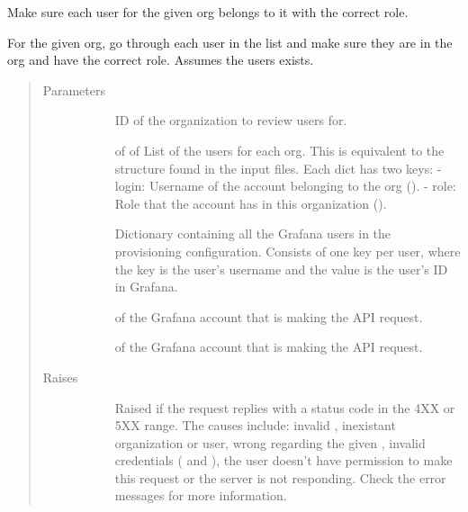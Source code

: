 \documentclass[letterpaper,10pt,english]{sphinxmanual}
\begin{document}
\begin{fulllineitems}
\label{\detokenize{accounts:gpAccounts.reviewOrgUsers}}
Make sure each user for the given org belongs to it with the correct role.

For the given org, go through each user in the list and make sure they are in
the org and have the correct role. Assumes the users exists.
\begin{quote}\begin{description}
\item[{Parameters}] \leavevmode\begin{description}
\item[{}] \leavevmode{[}\sphinxtitleref{int}{]}
ID of the organization to review users for.

\item[{}] \leavevmode{[} of  of \sphinxtitleref{str}{]}
List of the users for each org. This is equivalent to the structure found
in the  input files. Each dict has two keys:
- login: Username of the account belonging to the org ().
- role: Role that the account has in this organization ().

\item[{}] \leavevmode{[}\sphinxtitleref{dict}{]}
Dictionary containing all the Grafana users in the provisioning 
configuration. Consists of one key per user, where the key is the user’s
username and the value is the user’s ID in Grafana.

\item[{}] \leavevmode{[}\sphinxtitleref{str}{]}
 of the Grafana account that is making the API request.

\item[{}] \leavevmode{[}\sphinxtitleref{str}{]}
 of the Grafana account that is making the API request.

\end{description}

\item[{Raises}] \leavevmode\begin{description}
\item[{}] \leavevmode
Raised if the request replies with a status code in the 4XX or 5XX range.
The causes include: invalid , inexistant organization or user, wrong
 regarding the given , invalid credentials ( and
), the user doesn’t have permission to make this request or the
server is not responding. Check the error messages for more information.


\end{description}
\end{description}
\end{quote}
\end{fulllineitems}
\end{document}
